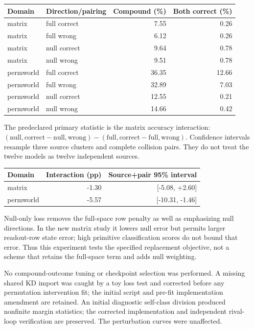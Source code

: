 \begin{center}\begin{tabular}{llrr}\toprule Domain & Direction/pairing & Compound (\%) & Both correct (\%)\\\midrule
matrix & full correct & 7.55 & 0.26\\
matrix & full wrong & 6.12 & 0.26\\
matrix & null correct & 9.64 & 0.78\\
matrix & null wrong & 9.51 & 0.78\\
permworld & full correct & 36.35 & 12.66\\
permworld & full wrong & 32.89 & 7.03\\
permworld & null correct & 12.55 & 0.21\\
permworld & null wrong & 14.66 & 0.42\\
\bottomrule\end{tabular}\end{center}

The predeclared primary statistic is the matrix accuracy interaction: $(\mathrm{null,correct}-\mathrm{null,wrong})-(\mathrm{full,correct}-\mathrm{full,wrong})$. Confidence intervals resample three source clusters and complete collision pairs. They do not treat the twelve models as twelve independent sources.

\begin{center}\begin{tabular}{lrr}\toprule Domain & Interaction (pp) & Source+pair 95\% interval\\\midrule
matrix & -1.30 & [-5.08, +2.60]\\
permworld & -5.57 & [-10.31, -1.46]\\
\bottomrule\end{tabular}\end{center}

Null-only loss removes the full-space row penalty as well as emphasizing null directions. In the new matrix study it lowers null error but permits larger readout-row state error; high primitive classification scores do not bound that error. Thus this experiment tests the specified replacement objective, not a scheme that retains the full-space term and adds null weighting.

No compound-outcome tuning or checkpoint selection was performed. A missing shared KD import was caught by a toy loss test and corrected before any permutation intervention fit; the initial script and pre-fit implementation amendment are retained. An initial diagnostic self-class division produced nonfinite margin statistics; the corrected implementation and independent rival-loop verification are preserved. The perturbation curves were unaffected.
